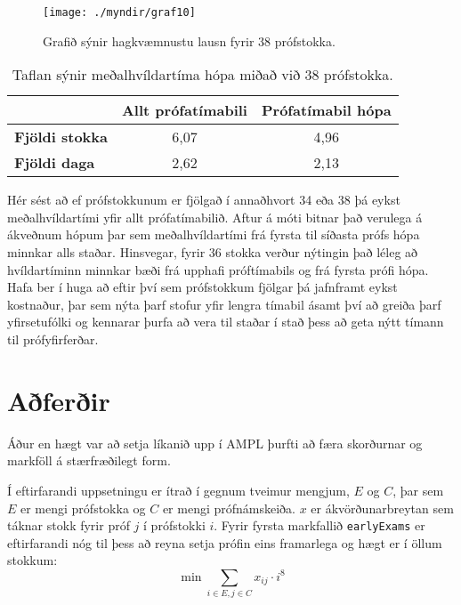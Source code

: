 \documentclass[12pt]{article}
\begin{document}
\newpage

\begin{figure}[h]
    \centering
    \texttt{[image: ./myndir/graf10]}
    \caption{Grafið sýnir hagkvæmnustu lausn fyrir 38 prófstokka.}
\end{figure}

\begin{table}[h]
    \centering
    \begin{tabular}{l|c|c|}
        \cline{2-3}
        & \multicolumn{1}{l|}{\textbf{Allt prófatímabili}} & \multicolumn{1}{l|}{\textbf{Prófatímabil hópa}} \\ \hline
        \multicolumn{1}{|l|}{\textbf{Fjöldi stokka}} & 6,07                                             & 4,96                                            \\ \hline
        \multicolumn{1}{|l|}{\textbf{Fjöldi daga}}   & 2,62                                             & 2,13                                            \\ \hline
    \end{tabular}
    \caption{Taflan sýnir meðalhvíldartíma hópa miðað við 38 prófstokka.}
\end{table}


Hér sést að ef prófstokkunum er fjölgað í annaðhvort 34 eða 38 þá eykst meðalhvíldartími yfir allt prófatímabilið. Aftur á móti bitnar það verulega á ákveðnum hópum þar sem meðalhvíldartími frá fyrsta til síðasta prófs hópa minnkar alls staðar. Hinsvegar, fyrir 36 stokka verður nýtingin það léleg að hvíldartíminn minnkar bæði frá upphafi próftímabils og frá fyrsta prófi hópa. Hafa ber í huga að eftir því sem prófstokkum fjölgar þá jafnframt eykst kostnaður, þar sem nýta þarf stofur yfir lengra tímabil ásamt því að greiða þarf yfirsetufólki og kennarar þurfa að vera til staðar í stað þess að geta nýtt tímann til prófyfirferðar.
\newpage

\section{Aðferðir}

Áður en hægt var að setja líkanið upp í AMPL þurfti að færa skorðurnar og markföll á stærfræðilegt form. 


\medskip
Í eftirfarandi uppsetningu er ítrað í gegnum tveimur mengjum, $ E $ og $ C $, þar sem $ E $ er mengi prófstokka og $ C $ er mengi prófnámskeiða. $ x $ er ákvörðunarbreytan sem táknar stokk fyrir próf $ j $ í prófstokki $ i $. Fyrir fyrsta markfallið \texttt{earlyExams} er eftirfarandi nóg til þess að reyna setja prófin eins framarlega og hægt er í öllum stokkum:
$$\min \sum_{i \in E,j \in C } x_{ij} \cdot i^8$$
\end{document}
